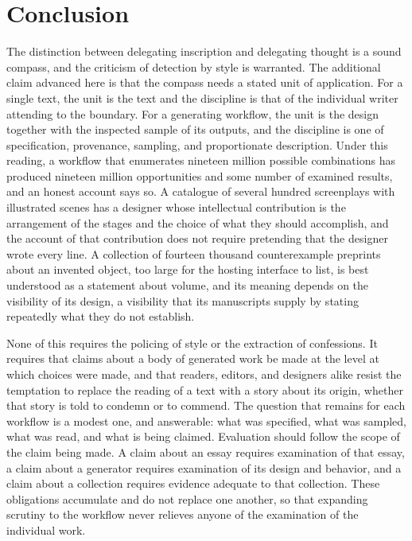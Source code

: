 \documentclass[12pt]{article}
\begin{document}
\section{Conclusion}

The distinction between delegating inscription and delegating thought is a sound compass, and the criticism of detection by style is warranted. The additional claim advanced here is that the compass needs a stated unit of application. For a single text, the unit is the text and the discipline is that of the individual writer attending to the boundary. For a generating workflow, the unit is the design together with the inspected sample of its outputs, and the discipline is one of specification, provenance, sampling, and proportionate description. Under this reading, a workflow that enumerates nineteen million possible combinations has produced nineteen million opportunities and some number of examined results, and an honest account says so. A catalogue of several hundred screenplays with illustrated scenes has a designer whose intellectual contribution is the arrangement of the stages and the choice of what they should accomplish, and the account of that contribution does not require pretending that the designer wrote every line. A collection of fourteen thousand counterexample preprints about an invented object, too large for the hosting interface to list, is best understood as a statement about volume, and its meaning depends on the visibility of its design, a visibility that its manuscripts supply by stating repeatedly what they do not establish.

None of this requires the policing of style or the extraction of confessions. It requires that claims about a body of generated work be made at the level at which choices were made, and that readers, editors, and designers alike resist the temptation to replace the reading of a text with a story about its origin, whether that story is told to condemn or to commend. The question that remains for each workflow is a modest one, and answerable: what was specified, what was sampled, what was read, and what is being claimed. Evaluation should follow the scope of the claim being made. A claim about an essay requires examination of that essay, a claim about a generator requires examination of its design and behavior, and a claim about a collection requires evidence adequate to that collection. These obligations accumulate and do not replace one another, so that expanding scrutiny to the workflow never relieves anyone of the examination of the individual work.
\end{document}
